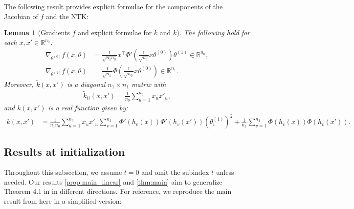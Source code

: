 \documentclass{article}
\newtheorem{lem}[thm]{Lemma}
\theoremstyle{definition}
\theoremstyle{remark}
\numberwithin{equation}{section}
\newcommand{\R}{\mathbb{R}}
\begin{document}
The following result provides explicit formulae for the components of the Jacobian of $f$ and the NTK:

\begin{lem}[Gradients $f$ and explicit formulae for $\tilde k$ and $k$]
    \label{lemma1}
    The following hold for each $x,x'\in \R^{n_0}$:
    \begin{align}
        \nabla_{\theta^{(0)}}f(x,\theta) &= \frac{1}{\sqrt{n_1n_0}}x^\top\Phi'(\frac{1}{\sqrt{n_0}}x\theta^{(0)})\theta^{(1)} \in \R^{n_0}, \\
        \nabla_{\theta^{(1)}}f(x,\theta) &= \frac{1}{\sqrt{n_1}}\Phi(\frac{1}{\sqrt{n_0}}x\theta^{(0)}) \in \R^{n_1}.
    \end{align}
    Moreover, $\tilde k(x,x')$ is a diagonal $n_1 \times n_1$ matrix with
    \begin{align}
        \tilde k_{ii}(x,x') = \frac{1}{n_0}\sum_{u=1}^{n_0}x_ux'_u,
    \end{align}
    and $k(x,x')$ is a real function given by:
    \begin{align}
        k(x,x') &=\frac{1}{n_1n_0}\sum_{u=1}^{n_0} x_ux'_u \sum_{v=1}^{n_1}\Phi'(h_v(x))\Phi'(h_v(x'))(\theta^{(1)}_v)^2 + \frac{1}{n_1}\sum_{v=1}^{n_1}\Phi(h_v(x))\Phi(h_v(x')).
    \end{align}
\end{lem}

\subsection{Results at initialization}

Throughout this subsection, we assume $t=0$ and omit the subindex $t$ unless needed.
Our results \ref{prop:main_linear} and \ref{thm:main} aim to generalize Theorem 4.1 in \cite{ trevisan2023wide} in different directions.
For reference, we reproduce the main result from \cite{trevisan2023wide} here in a simplified version:
\end{document}
